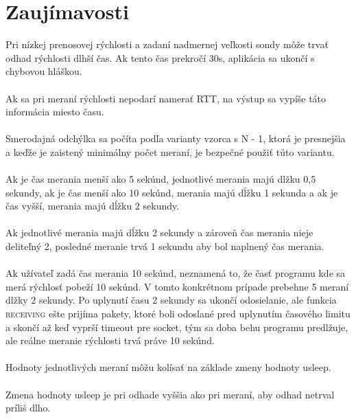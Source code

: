 \documentclass[a4paper, 11pt]{article}
\begin{document}
\section{Zaujímavosti}
Pri nízkej prenosovej rýchlosti a zadaní nadmernej veľkosti sondy môže trvať odhad rýchlosti dlhší čas. Ak tento čas prekročí 30s, aplikácia sa ukončí s chybovou hláškou.\\\\
Ak sa pri meraní rýchlosti nepodarí namerať RTT, na výstup sa vypíše táto informácia miesto času.\\\\
Smerodajná odchýlka sa počíta podľa varianty vzorca s N - 1, ktorá je presnejšia a keďže je zaistený minimálny počet meraní, je bezpečné použiť túto variantu.\\\\
Ak je čas merania menší ako 5 sekúnd, jednotlivé merania majú dlžku 0,5 sekundy, ak je čas menší ako 10 sekúnd, merania majú dĺžku 1 sekunda a ak je čas vyšší, merania majú dĺžku 2 sekundy.\\\\
Ak jednotlivé merania majú dĺžku 2 sekundy a zároveň čas merania nieje deliteľný 2, posledné meranie trvá 1 sekundu aby bol naplnený čas merania.\\\\
Ak užívateľ zadá čas merania 10 sekúnd, neznamená to, že časť programu kde sa merá rýchlosť pobeží 10 sekúnd. V tomto konkrétnom prípade prebehne 5 meraní dlžky 2 sekundy. Po uplynutí času 2 sekundy sa ukončí odosielanie, ale funkcia \textsc{receiving} ešte prijíma pakety, ktoré boli odoslané pred uplynutím časového limitu a skončí až keď vyprší timeout pre socket, tým sa doba behu programu predlžuje, ale reálne meranie rýchlosti trvá práve 10 sekúnd.\\\\
Hodnoty jednotlivých meraní môžu kolísať na základe zmeny hodnoty usleep.\\\\
Zmena hodnoty usleep je pri odhade vyššia ako pri meraní, aby odhad netrval príliš dlho.

\newpage
\end{document}
